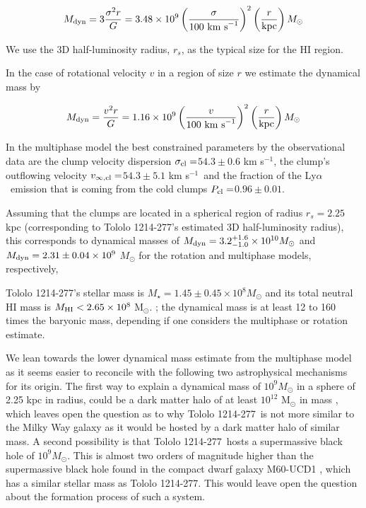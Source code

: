 \documentclass[a4,useAMS,usenatbib,usegraphicx]{mn2e}
\newcommand{\tol}{Tololo 1214-277}
\newcommand{\lya}{Ly$\alpha$}
\newcommand{\sigmaclump}{$54.3\pm 0.6$ km s$^{-1}$}
\newcommand{\inftyclump}{$54.3\pm 5.1$ km s$^{-1}$}
\newcommand{\probaclump}{$0.96\pm 0.01$}
\begin{document}
\begin{equation}
M_{\rm dyn} = 3 \frac{\sigma ^{2}r}{G} = 3.48\times10^{9}
\left(\frac{\sigma}{100\ \mathrm{km\ s}^{-1}}\right)^2\left(\frac{r}{\mathrm{kpc}}\right) M_{\odot}
\end{equation}

We use the 3D half-luminosity
radius, $r_{s}$, as the typical size for the HI region. 

In the case of rotational velocity $v$ in a region of size $r$ we
estimate the dynamical mass by 

\begin{equation}
M_{\rm dyn} = \frac{v ^{2}r}{G} = 1.16\times10^{9}
\left(\frac{v}{100\ \mathrm{km\ s}^{-1}}\right)^2\left(\frac{r}{\mathrm{kpc}}\right)M_{\odot} 
\end{equation}


In the multiphase model the best constrained parameters by the
observational data are the clump velocity dispersion
$\sigma_{\rm{cl}}=$\sigmaclump ,  the clump's outflowing velocity
$v_{\infty, \rm{cl}}=$\inftyclump\ and the fraction of the
\lya\ emission that is  coming from the cold clumps  $P_{\rm cl}=$\probaclump.


Assuming that the clumps are located in a spherical region of radius
$r_s=2.25$ kpc (corresponding to \tol's estimated 3D half-luminosity
radius), 
this corresponds to dynamical masses of $M_{\rm dyn} =
3.2_{-1.0}^{+1.6}\times 10^{10} M_{\odot}$ and $M_{\rm
  dyn}=2.31\pm0.04 \times 10^{9}$ $M_{\odot}$ for the
rotation and multiphase models, respectively, 

\tol's stellar mass is  $M_{\star} = 1.45\pm0.45\times 10^{8}
M_{\odot}$   \citep{2014PASP..126.1079M} and its total neutral HI mass is $M_{\rm HI}<2.65\times 10^{8}$ M$_{\odot}$. 
\citep{pustilnikmartin07}; the dynamical mass is at least 12 to 160 times
the baryonic mass, depending if one considers the multiphase or
rotation estimate. 

We lean towards the lower dynamical mass estimate from the multiphase
model as it seems easier to reconcile with the following two
astrophysical mechanisms for its origin.
The first way to explain a dynamical mass of $10^{9} M_{\odot}$
in a sphere of 2.25 kpc in radius, could be a dark matter halo of at
least $10^{12}$ M$_{\odot}$ in mass \citep{2011ApJ...726..108T}, which
leaves open the question as to why  \tol\ is not more similar to the
Milky Way galaxy as it would be hosted by a dark matter halo of similar
mass. 
A second possibility is that \tol\ hosts a supermassive black hole of
$10^{9} M_{\odot}$. This is almost two orders of magnitude higher
than the supermassive black hole found in the compact dwarf galaxy
M60-UCD1 \citep{2014Natur.513..398S}, which has a similar stellar mass
as \tol. This would leave open the question about the formation
process of such a system.   
 
\end{document}
